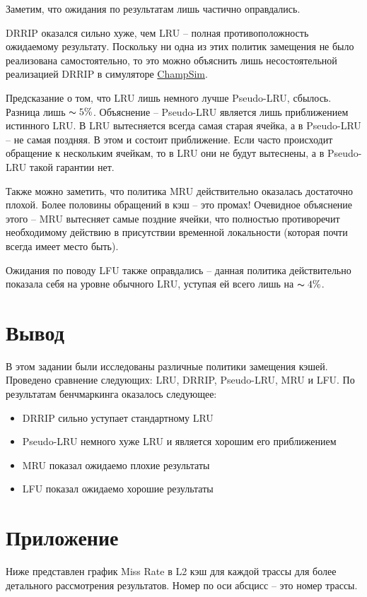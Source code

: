 	\newpage
	Заметим, что ожидания по результатам лишь частично оправдались.
	
	DRRIP оказался сильно хуже, чем LRU -- полная противоположность ожидаемому результату. Поскольку ни одна из этих политик замещения не было реализована самостоятельно, то это можно объяснить лишь несостоятельной реализацией DRRIP в симуляторе \href{https://github.com/ChampSim/ChampSim}{ChampSim}.
	
	Предсказание о том, что LRU лишь немного лучше Pseudo-LRU, сбылось. Разница лишь $\thicksim 5 \%$. Объяснение -- Pseudo-LRU является лишь приближением истинного LRU. В LRU вытесняется всегда самая старая ячейка, а в Pseudo-LRU -- не самая поздняя. В этом и состоит приближение. Если часто происходит обращение к нескольким ячейкам, то в LRU они не будут вытеснены, а в Pseudo-LRU такой гарантии нет.
	
	Также можно заметить, что политика MRU действительно оказалась достаточно плохой. Более половины обращений в кэш -- это промах! Очевидное объяснение этого -- MRU вытесняет самые поздние ячейки, что полностью противоречит необходимому действию в присутствии временной локальности (которая почти всегда имеет место быть).
	
	Ожидания по поводу LFU также оправдались -- данная политика действительно показала себя на уровне обычного LRU, уступая ей всего лишь на $\thicksim 4 \%$.
	
	\newpage
	
	\section*{Вывод}
	В этом задании были исследованы различные политики замещения кэшей. Проведено сравнение следующих: LRU, DRRIP, Pseudo-LRU, MRU и LFU. По результатам бенчмаркинга оказалось следующее:
	\begin{itemize}
		\item DRRIP сильно уступает стандартному LRU
		\item Pseudo-LRU немного хуже LRU и является хорошим его приближением
		\item MRU показал ожидаемо плохие результаты
		\item LFU показал ожидаемо хорошие результаты
	\end{itemize}

	\newpage
	\section*{Приложение}
	Ниже представлен график Miss Rate в L2 кэш для каждой трассы для более детального рассмотрения результатов. Номер по оси абсцисс -- это номер трассы.

